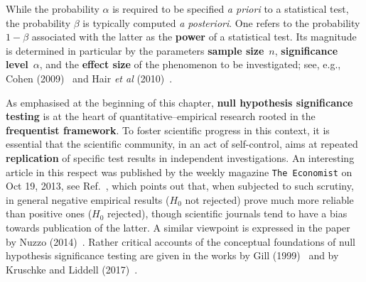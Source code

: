 \medskip
\noindent
While the probability $\alpha$ is required to be specified
\textit{a priori} to a statistical test, the probability $\beta$ is 
typically computed \textit{a posteriori}. One refers to the 
probability $1-\beta$ associated with the latter as the
\textbf{power} of a statistical test. Its magnitude is determined
in particular by the parameters \textbf{sample size}~$n$,
\textbf{significance level}~$\alpha$, and the \textbf{effect size}
of the phenomenon to be investigated; see, e.g., Cohen 
(2009)~ and Hair \textit{et al} 
(2010)~.


\medskip
\noindent
As emphasised at the beginning of this chapter, \textbf{null
hypothesis significance testing} is at the heart of
quantitative--empirical research rooted in the
\textbf{frequentist framework}. To foster scientific progress in
this context, it is essential that the scientific community, in an
act of self-control, aims at repeated \textbf{replication} of
specific test results in independent investigations. An interesting
article in this respect was published by the weekly magazine
\texttt{The Economist} on Oct 19, 2013, see Ref.~,
which points out that, when subjected to such scrutiny, in general
negative empirical results ($H_{0}$ not rejected) prove much more
reliable than positive ones ($H_{0}$ rejected), though scientific
journals tend to have a bias towards publication of the latter.
A similar viewpoint is expressed in the paper by Nuzzo
(2014)~. Rather critical accounts of the conceptual
foundations of null hypothesis significance testing are given in
the works by Gill (1999)~ and by Kruschke and Liddell
(2017)~.

